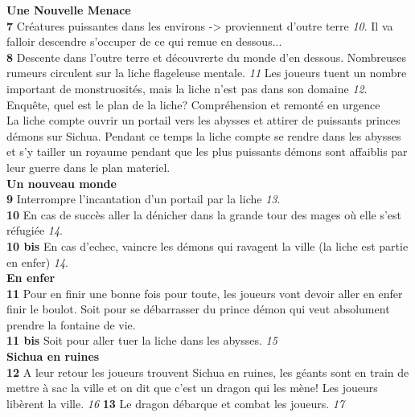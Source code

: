 {\bf Une Nouvelle Menace} \\
{\bf 7} Créatures puissantes dans les environs -> proviennent d'outre terre {\it 10}.
  Il va falloir descendre s'occuper de ce qui remue en dessous... \\
{\bf 8} Descente dans l'outre terre et découvrerte du monde d'en dessous.
  Nombreuses rumeurs circulent sur la liche flageleuse mentale. {\it 11}
  Les joueurs tuent un nombre important de monstruosités, mais la liche n'est pas dans son domaine {\it 12}.
  Enquête, quel est le plan de la liche? Compréhension et remonté en urgence \\
  La liche compte ouvrir un portail vers les abysses et attirer de puissants princes démons sur Sichua. 
  Pendant ce temps la liche compte se rendre dans les abysses et s'y tailler un royaume pendant que les plus 
  puissants démons sont affaiblis par leur guerre dans le plan materiel. \\

{\bf Un nouveau monde} \\
{\bf 9} Interrompre l'incantation d'un portail par la liche {\it 13}. \\
{\bf 10} En cas de succès aller la dénicher dans la grande tour des mages où elle s'est réfugiée {\it 14}. \\
{\bf 10 bis} En cas d'echec, vaincre les démons qui ravagent la ville (la liche est partie en enfer) {\it 14}. \\

{\bf En enfer} \\
{\bf 11} Pour en finir une bonne fois pour toute, les joueurs vont devoir aller en enfer finir le boulot. 
Soit pour se débarrasser du prince démon qui veut absolument prendre la fontaine de vie. \\
{\bf 11 bis} Soit pour aller tuer la liche dans les abysses. {\it 15} \\

{\bf Sichua en ruines} \\
{\bf 12} A leur retour les joueurs trouvent Sichua en ruines, les géants sont en train de 
mettre à sac la ville et on dit que c'est un dragon qui les mène! Les joueurs libèrent la ville. {\it 16}
{\bf 13} Le dragon débarque et combat les joueurs. {\it 17}
